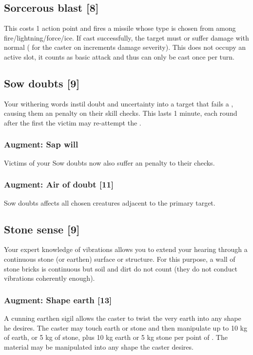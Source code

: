 \subsection{Sorcerous blast [8]}
\label{spell:sorc-blast}
This costs 1 action point and fires a missile whose type is chosen from among fire/lightning/force/ice. If cast successfully, the target must  or suffer damage with normal  ( for the caster on  increments damage severity). This does not occupy an active  slot, it counts as basic attack and thus can only be cast once per turn.


\subsection{Sow doubts [9]}
Your withering words instil doubt and uncertainty into a target that fails a , causing them an  penalty on their skill checks. This lasts 1 minute, each round after the first the victim may re-attempt the . 
\subsubsection{Augment: Sap will}
Victims of your Sow doubts now also suffer an  penalty to their  checks.
\subsubsection{Augment: Air of doubt [11]}
Sow doubts affects all chosen creatures adjacent to the primary target.


\subsection{Stone sense [9]}
\label{spell:stone-sense}
Your expert knowledge of vibrations allows you to extend your hearing through a continuous stone (or earthen) surface or structure. For this purpose, a wall of stone bricks is continuous but soil and dirt do not count (they do not conduct vibrations coherently enough). 
\subsubsection{Augment: Shape earth [13]}
A cunning earthen sigil allows the caster to twist the very earth into any shape he desires. The caster may touch earth or stone and then manipulate up to 10 kg of earth, or 5 kg of stone, plus 10 kg earth or 5 kg stone per point of . The material may be manipulated into any shape the caster desires.


